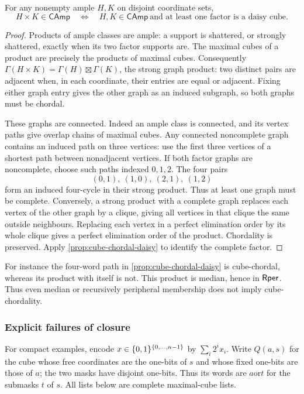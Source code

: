 \begin{proposition}
\label{prop:cube-chordal-product}
For any nonempty ample $H,K$ on disjoint coordinate sets,
\[
 H\times K\in\mathsf{CAmp}
 \quad\Longleftrightarrow\quad
 H,K\in\mathsf{CAmp}\ \text{and at least one factor is a daisy cube}.
\]
\end{proposition}
\begin{proof}
Products of ample classes are ample: a support is shattered, or strongly
shattered, exactly when its two factor supports are. The maximal cubes
of a product are precisely the products of maximal cubes. Consequently
$\Gamma(H\times K)=\Gamma(H)\boxtimes\Gamma(K)$, the strong graph
product: two distinct pairs are adjacent when, in each coordinate, their
entries are equal or adjacent. Fixing either graph entry gives the other
graph as an induced subgraph, so both graphs must be chordal.

These graphs are connected. Indeed an ample class is connected, and
its vertex paths give overlap chains of maximal cubes. Any connected
noncomplete graph contains an induced path on three vertices: use the
first three vertices of a shortest path between nonadjacent vertices.
If both factor graphs are noncomplete, choose such paths indexed $0,1,2$.
The four pairs
\[
 (0,1),\ (1,0),\ (2,1),\ (1,2)
\]
form an induced four-cycle in their strong product. Thus at least one
graph must be complete. Conversely, a strong product with a complete
graph replaces each vertex of the other graph by a clique, giving all
vertices in that clique the same outside neighbours. Replacing each
vertex in a perfect elimination order by its whole clique gives a
perfect elimination order of the product. Chordality is preserved.
Apply \cref{prop:cube-chordal-daisy} to identify the complete factor.
\end{proof}

For instance the four-word path in
\cref{prop:cube-chordal-daisy} is cube-chordal, whereas its product
with itself is not. This product is median, hence in $\mathsf{Rper}$.
Thus even median or recursively peripheral membership does not imply
cube-chordality.

\subsubsection{Explicit failures of closure}

For compact examples, encode $x\in\{0,1\}^{\{0,\ldots,n-1\}}$ by
$\sum_i2^ix_i$. Write $Q(a,s)$ for the cube whose free coordinates
are the one-bits of $s$ and whose fixed one-bits are those of $a$;
the two masks have disjoint one-bits. Thus its words are $a\mathbin{\mathrm{or}}t$
for the submasks $t$ of $s$. All lists below are complete maximal-cube lists.

